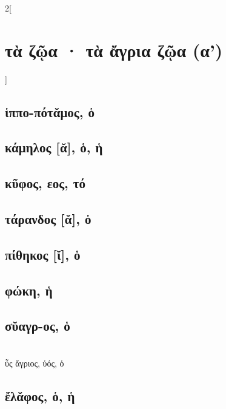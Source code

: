 \documentclass{book}
\begin{document}
\newpage  
\begin{multicols}{2}[\section{τὰ ζῷα · τὰ ἄγρια ζῷα (α')}]
\subsection{ἱππο-πότᾰμος, ὁ}
\subsection{κάμηλος [ᾰ], ὁ, ἡ}
\subsection{κῦφος, εος, τό}
\subsection{τάρανδος [ᾰ], ὁ}
\subsection{πίθηκος [ῐ], ὁ}
\subsection{φώκη, ἡ}
\subsection{σῠαγρ-ος, ὁ}
 ~\\
ὖς ἄγριος, ὑός, ὁ
\subsection{ἔλᾰφος, ὁ, ἡ}
~
\end{multicols}
\newpage  
\end{document}
